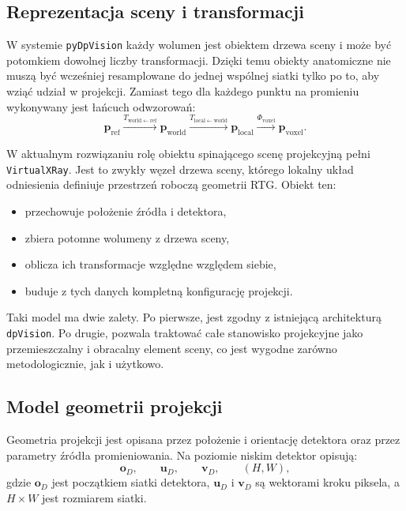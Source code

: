 \documentclass[11pt,a4paper]{article}
\begin{document}
\subsection{Reprezentacja sceny i transformacji}

W systemie \texttt{pyDpVision} każdy wolumen jest obiektem drzewa sceny i może być
potomkiem dowolnej liczby transformacji. Dzięki temu obiekty anatomiczne nie muszą
być wcześniej resamplowane do jednej wspólnej siatki tylko po to, aby wziąć udział
w projekcji. Zamiast tego dla każdego punktu na promieniu wykonywany jest łańcuch
odwzorowań:
\[
  \mathbf{p}_{\mathrm{ref}}
  \xrightarrow{T_{\mathrm{world}\leftarrow\mathrm{ref}}}
  \mathbf{p}_{\mathrm{world}}
  \xrightarrow{T_{\mathrm{local}\leftarrow\mathrm{world}}}
  \mathbf{p}_{\mathrm{local}}
  \xrightarrow{\Phi_{\mathrm{voxel}}}
  \mathbf{p}_{\mathrm{voxel}}.
\]

W aktualnym rozwiązaniu rolę obiektu spinającego scenę projekcyjną pełni
\texttt{VirtualXRay}. Jest to zwykły węzeł drzewa sceny, którego lokalny układ
odniesienia definiuje przestrzeń roboczą geometrii RTG. Obiekt ten:
\begin{itemize}
\item przechowuje położenie źródła i detektora,
\item zbiera potomne wolumeny z drzewa sceny,
\item oblicza ich transformacje względne względem siebie,
\item buduje z tych danych kompletną konfigurację projekcji.
\end{itemize}

Taki model ma dwie zalety. Po pierwsze, jest zgodny z istniejącą architekturą
\texttt{dpVision}. Po drugie, pozwala traktować całe stanowisko projekcyjne jako
przemieszczalny i obracalny element sceny, co jest wygodne zarówno metodologicznie,
jak i użytkowo.

\subsection{Model geometrii projekcji}

Geometria projekcji jest opisana przez położenie i orientację detektora oraz przez
parametry źródła promieniowania. Na poziomie niskim detektor opisują:
\[
  \mathbf{o}_D,\qquad \mathbf{u}_D,\qquad \mathbf{v}_D,\qquad (H,W),
\]
gdzie \(\mathbf{o}_D\) jest początkiem siatki detektora, \(\mathbf{u}_D\) i
\(\mathbf{v}_D\) są wektorami kroku piksela, a \(H\times W\) jest rozmiarem siatki.
\end{document}
